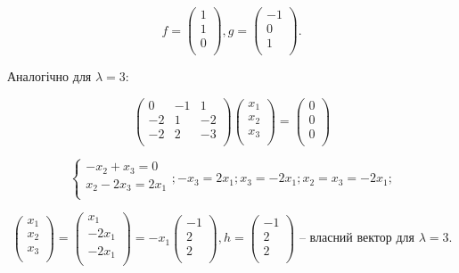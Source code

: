 $$f = \begin{pmatrix}
	1 \\
	1 \\
	0 \\
\end{pmatrix}, g = \begin{pmatrix}
	-1 \\
	0 \\
	1 \\
\end{pmatrix}.$$

Аналогічно для $\lambda = 3$:

$$\begin{pmatrix}
	 0 & -1 &  1 \\
	-2 &  1 & -2 \\
	-2 &  2 & -3 \\
\end{pmatrix} \begin{pmatrix}
	x_1 \\
	x_2 \\
	x_3 \\
\end{pmatrix} = \begin{pmatrix}
	0 \\
	0 \\
	0 \\
\end{pmatrix} $$

$$\left\{ \begin{matrix}
	-x_2 + x_3 = 0 \\
	x_2 - 2 x_3 = 2 x_1 \\
\end{matrix} \right.; -x_3 = 2x_1; x_3 = -2x_1; x_2 = x_3 = -2x_1;$$

$$\begin{pmatrix}
	x_1 \\
	x_2 \\
	x_3 \\
\end{pmatrix} = \begin{pmatrix}
	x_1 \\
	-2 x_1 \\
	-2 x_1 \\
\end{pmatrix} = -x_1 \begin{pmatrix}
	-1 \\
	 2 \\
	 2 \\
\end{pmatrix}, h = \begin{pmatrix}
	-1 \\
	 2 \\
	 2 \\
\end{pmatrix} \text{ -- власний вектор для } \lambda = 3.$$

